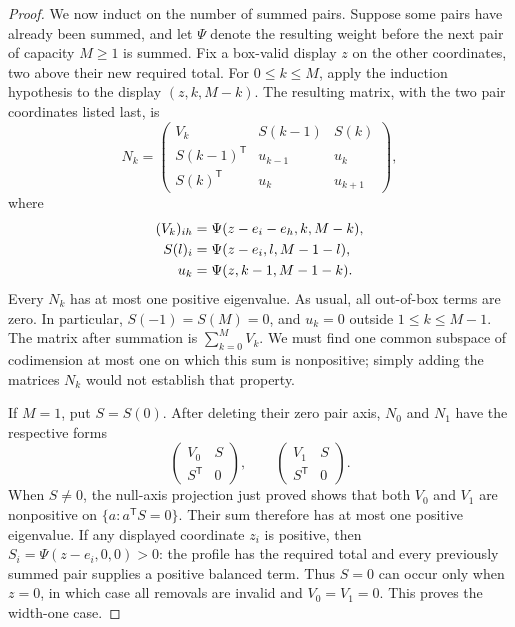 \begin{proof}
We now induct on the number of summed pairs.
Suppose some pairs have already been summed, and let \(\Psi\) denote
the resulting weight before the next pair of capacity \(M\ge1\) is
summed.
Fix a box-valid display \(z\) on the other coordinates, two above
their new required total.
For \(0\le k\le M\), apply the induction hypothesis to the display
\((z,k,M-k)\).
The resulting matrix, with the two pair coordinates listed last, is
\begin{equation}
 N_k=
 \begin{pmatrix}
  V_k&S(k-1)&S(k)\\
  S(k-1)^{\mathsf T}&u_{k-1}&u_k\\
  S(k)^{\mathsf T}&u_k&u_{k+1}
 \end{pmatrix},
 \label{eq:integer-summation-matrix}
\end{equation}
where
\begin{align}
 (V_k)_{ih}&=\Psi(z-e_i-e_h,k,M-k), \notag\\
 S(l)_i&=\Psi(z-e_i,l,M-1-l), \notag\\
 u_k&=\Psi(z,k-1,M-1-k).
 \label{eq:integer-summation-entries}
\end{align}
Every \(N_k\) has at most one positive eigenvalue.
As usual, all out-of-box terms are zero.
In particular, \(S(-1)=S(M)=0\), and \(u_k=0\) outside
\(1\le k\le M-1\).
The matrix after summation is $\sum_{k=0}^M V_k$.  We must find
one common subspace of codimension at most one on which this sum is
nonpositive; simply adding the matrices $N_k$ would not establish
that property.

If $M=1$, put $S=S(0)$.  After deleting their zero pair axis, $N_0$
and $N_1$ have the respective forms
\[
 \begin{pmatrix}V_0&S\\S^{\mathsf T}&0\end{pmatrix},
 \qquad
 \begin{pmatrix}V_1&S\\S^{\mathsf T}&0\end{pmatrix}.
\]
When $S\ne0$, the null-axis projection just proved shows that both
$V_0$ and $V_1$ are nonpositive on $\{a:a^{\mathsf T}S=0\}$.
Their sum therefore has at most one positive eigenvalue.
If any displayed coordinate $z_i$ is positive, then
$S_i=\Psi(z-e_i,0,0)>0$: the profile has the required total and every
previously summed pair supplies a positive balanced term.  Thus
$S=0$ can occur only when $z=0$, in which case all removals are invalid
and $V_0=V_1=0$.  This proves the width-one case.


\end{proof}
